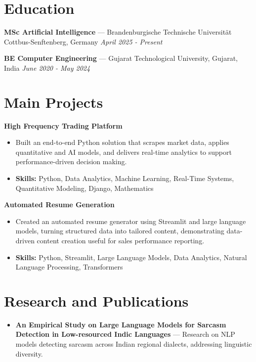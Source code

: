 \documentclass[a4paper,10pt]{article}
\begin{document}
\section*{Education}
\textbf{MSc Artificial Intelligence} — Brandenburgische Technische Universität Cottbus-Senftenberg, Germany \hfill \textit{April 2025 - Present}\par
\vspace{1.5pt}
\textbf{BE Computer Engineering} — Gujarat Technological University, Gujarat, India \hfill \textit{June 2020 - May 2024}\par

\section*{Main Projects}
\textbf{High Frequency Trading Platform}\par
\vspace{1pt}
\begin{itemize}
  \item Built an end-to-end Python solution that scrapes market data, applies quantitative and AI models, and delivers real-time analytics to support performance-driven decision making.
  \item \textbf{Skills:} Python, Data Analytics, Machine Learning, Real-Time Systems, Quantitative Modeling, Django, Mathematics
\end{itemize}
\vspace{3pt}
\textbf{Automated Resume Generation}\par
\vspace{1pt}
\begin{itemize}
  \item Created an automated resume generator using Streamlit and large language models, turning structured data into tailored content, demonstrating data-driven content creation useful for sales performance reporting.
  \item \textbf{Skills:} Python, Streamlit, Large Language Models, Data Analytics, Natural Language Processing, Transformers
\end{itemize}

\section*{Research and Publications}
\begin{itemize}
\item \textbf{An Empirical Study on Large Language Models for Sarcasm Detection in Low-resourced Indic Languages} — Research on NLP models detecting sarcasm across Indian regional dialects, addressing linguistic diversity.
\end{itemize}
\end{document}
